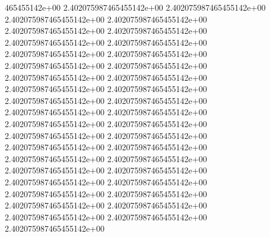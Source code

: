 465455142e+00	2.402075987465455142e+00	2.402075987465455142e+00	2.402075987465455142e+00	2.402075987465455142e+00	2.402075987465455142e+00	2.402075987465455142e+00	2.402075987465455142e+00	2.402075987465455142e+00	2.402075987465455142e+00	2.402075987465455142e+00	2.402075987465455142e+00	2.402075987465455142e+00	2.402075987465455142e+00	2.402075987465455142e+00	2.402075987465455142e+00	2.402075987465455142e+00	2.402075987465455142e+00	2.402075987465455142e+00	2.402075987465455142e+00	2.402075987465455142e+00	2.402075987465455142e+00	2.402075987465455142e+00	2.402075987465455142e+00	2.402075987465455142e+00	2.402075987465455142e+00	2.402075987465455142e+00	2.402075987465455142e+00	2.402075987465455142e+00	2.402075987465455142e+00	2.402075987465455142e+00	2.402075987465455142e+00	2.402075987465455142e+00	2.402075987465455142e+00	2.402075987465455142e+00	2.402075987465455142e+00	2.402075987465455142e+00	2.402075987465455142e+00	2.402075987465455142e+00	2.402075987465455142e+00
